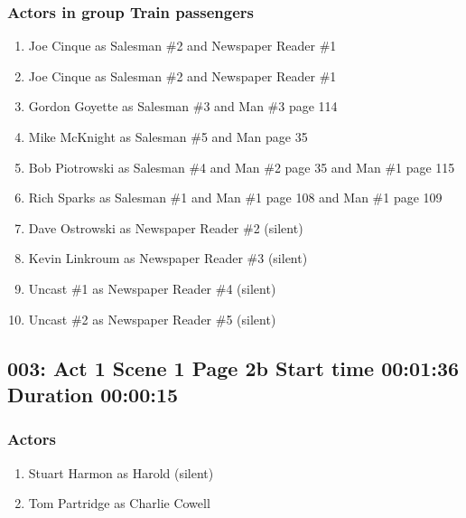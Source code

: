 \subsubsection{Actors in group Train passengers}
\begin{enumerate}
\item Joe Cinque as Salesman \#2 and Newspaper Reader \#1
\item Joe Cinque as Salesman \#2 and Newspaper Reader \#1
\item Gordon Goyette as Salesman \#3 and Man \#3 page 114
\item Mike McKnight as Salesman \#5 and Man page 35
\item Bob Piotrowski as Salesman \#4 and Man \#2 page 35 and Man \#1 page 115
\item Rich Sparks as Salesman \#1 and Man \#1 page 108 and Man \#1 page 109
\item Dave Ostrowski as Newspaper Reader \#2 (silent)
\item Kevin Linkroum as Newspaper Reader \#3 (silent)
\item Uncast \#1 as Newspaper Reader \#4 (silent)
\item Uncast \#2 as Newspaper Reader \#5 (silent)
\end{enumerate}


\subsection{003: Act 1 Scene 1 Page 2b Start time 00:01:36 Duration 00:00:15}

\subsubsection{Actors}
\begin{enumerate}
\item Stuart Harmon as Harold (silent)
\item Tom Partridge as Charlie Cowell
\end{enumerate}
